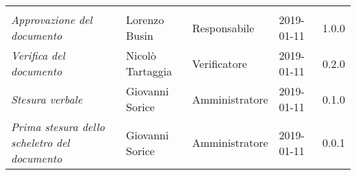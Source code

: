 \newpage 
\section*{}
\begin{table}[H]
	\centering
	\begin{tabular}{p{4cm}|C{3cm}|C{3cm}|R{2.5cm}|R{2cm}}
		
		 & & & & \\
		
		
		\emph{Approvazione del documento} & Lorenzo Busin & Responsabile & 2019-01-11 & 1.0.0 \\
		\hline
		
		\emph{Verifica del documento} & Nicolò Tartaggia & Verificatore & 2019-01-11 & 0.2.0 \\
		\hline

		\emph{Stesura verbale} & Giovanni Sorice & Amministratore & 2019-01-11 & 0.1.0 \\
		\hline
		
		\emph{Prima stesura dello scheletro del documento} & Giovanni Sorice & Amministratore & 2019-01-11 & 0.0.1 \\
		
	\end{tabular}
	
\end{table}


\clearpage